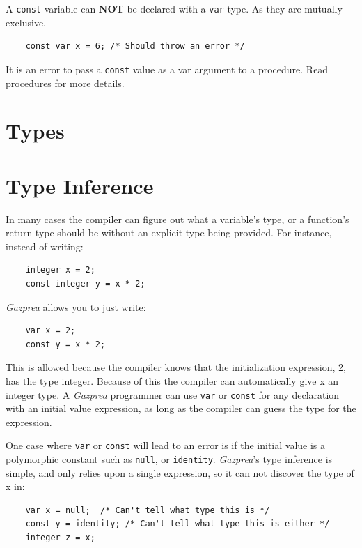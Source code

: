 \documentclass{article}
\begin{document}
  A \texttt{const} variable can \textbf{NOT} be declared with a \texttt{var} type. As they are mutually exclusive.

  \begin{lstlisting}
    const var x = 6; /* Should throw an error */
  \end{lstlisting}

  It is an error to pass a \texttt{const} value as a var argument to a procedure.  Read procedures for more details.


\section{Types}
\label{sec:types}



\section{Type Inference}\label{sec:typeInference}


  In many cases the compiler can figure out what a variable's type, or a function's return type should be without an
  explicit type being provided. For instance, instead of writing:

  \begin{lstlisting}
    integer x = 2;
    const integer y = x * 2;
  \end{lstlisting}

  \textit{Gazprea} allows you to just write:

  \begin{lstlisting}
    var x = 2;
    const y = x * 2;
  \end{lstlisting}

  This is allowed because the compiler knows that the initialization expression, 2, has the type integer. Because of
  this the compiler can automatically give x an integer type. A \textit{Gazprea} programmer can use \texttt{var} or
  \texttt{const} for any declaration with an initial value expression, as long as the compiler can guess the type for
  the expression.

  One case where \texttt{var} or \texttt{const} will lead to an error is if the initial value is a polymorphic
  constant such as \texttt{null}, or \texttt{identity}.  \textit{Gazprea}'s type inference is simple, and only relies
  upon a single expression, so it can not discover the type of x in:

  \begin{lstlisting}
    var x = null;  /* Can't tell what type this is */
    const y = identity; /* Can't tell what type this is either */
    integer z = x;
  \end{lstlisting}
\end{document}

